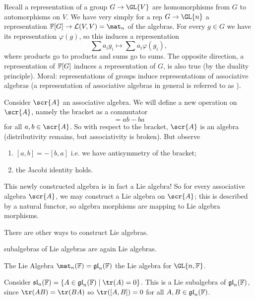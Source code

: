 Recall a representation of a group $G\to\GL{V}$ are homomorphisms
from $G$ to automorphisms on $V$. We have very simply for a rep
$G\to\GL{n}$ a representation
$\Bbb{F}[G]\to\mathcal{L}(V,V)=\mat_{n}$ of the algebras. For
every $g\in G$ we have its representation $\varphi(g)$, so this
induces a representation
\begin{equation}
\sum a_{i}g_{i}\mapsto \sum a_{i}\varphi(g_{i}),
\end{equation}
where products go to products and sums go to sums. The opposite
direction, a representation of $\Bbb{F}[G]$ induces a
representation of $G$, is also true (by the duality
principle). Moral: representations of groups induce
representations of associative algebras (a representation of
associative algebras in general is referred to as
).

Consider $\scr{A}$ an associative algebra. We will define a new
operation on $\scr{A}$, namely the bracket as a commutator
\begin{equation}
[a,b]=ab-ba
\end{equation}
for all $a,b\in\scr{A}$. So with respect to the bracket,
$\scr{A}$ is an algebra (distributivity remains, but
associativity is broken). But observe
\begin{enumerate}
\item $[a,b]=-[b,a]$ i.e. we have antisymmetry of the bracket;
\item the Jacobi identity holds.
\end{enumerate}
This newly constructed algebra is in fact a Lie algebra! So for
every associative algebra $\scr{A}$, we may construct a Lie
algebra on $\scr{A}$; this is described by a natural functor, so
algebra morphisms are mapping to Lie algebra morphisms.

\begin{rmk}
There are other ways to construct Lie algebras. 

 subalgebras of Lie algebras are again Lie algebras.
\end{rmk}

\begin{ex}
The Lie Algebra $\mat_{n}(\Bbb{F})=\frak{gl}_{n}(\Bbb{F})$ the
Lie algebra for $\GL{n,\Bbb{F}}$.
\end{ex}
\begin{ex}
Consider
$\frak{sl}_{n}(\Bbb{F})=\{A\in\frak{gl}_{n}(\Bbb{F})\mid\tr(A)=0\}$. This
is a Lie subalgebra of $\frak{gl}_{n}(\Bbb{F})$, since
$\tr(AB)=\tr(BA)$ so $\tr([A,B])=0$ for all $A,B\in\frak{gl}_{n}(\Bbb{F})$.
\end{ex}

